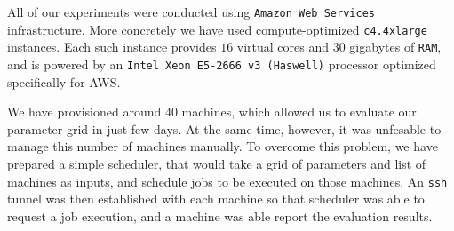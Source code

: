         All of our experiments were conducted using \texttt{Amazon Web Services} infrastructure.
        More concretely we have used compute-optimized \texttt{c4.4xlarge} instances. Each such
        instance provides $16$ virtual cores and $30$ gigabytes of \texttt{RAM}, and is powered
        by an \texttt{Intel Xeon E5-2666 v3 (Haswell)} processor optimized specifically for AWS.

        We have provisioned around $40$ machines, which allowed us to evaluate our parameter grid
        in just few days.
        At the same time, however, it was unfesable to manage this number of machines manually.
        To overcome this problem, we have prepared a simple scheduler,
        that would take a grid of parameters and list of machines as inputs, and schedule
        jobs to be executed on those machines.
        An \texttt{ssh} tunnel was then established with each machine so that scheduler
        was able to request a job execution, and a machine was able report the evaluation results.
